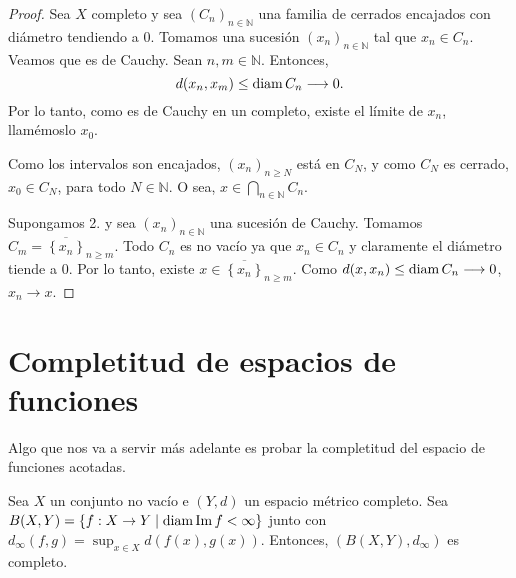 \begin{proof}
	 Sea $X$ completo y sea $(C_n)_{n \in \mathbb{N}}$ una familia de cerrados encajados con diámetro tendiendo a $0$. Tomamos una sucesión $(x_n)_{n \in \mathbb{N}}$ tal que $x_n \in C_n$. Veamos que es de Cauchy. Sean $n, m \in \mathbb{N}$. Entonces,
	\begin{equation*}
		d(x_n, x_m) \leq \operatorname{diam} C_n \longrightarrow 0.
	\end{equation*}
	Por lo tanto, como es de Cauchy en un completo, existe el límite de $x_n$, llamémoslo $x_0$.

	Como los intervalos son encajados, $(x_n)_{n \geq N}$ está en $C_N$, y como $C_N$ es cerrado, $x_0 \in C_N$, para todo $N \in \mathbb{N}$. O sea, $x \in \bigcap_{n \in \mathbb{N}} C_n$.

	 Supongamos 2. y sea $(x_n)_{n \in \mathbb{N}}$ una sucesión de Cauchy. Tomamos $C_m = \overline{\left\{ x_n \right\}}_{n \geq m}$. Todo $C_n$ es no vacío ya que $x_n \in C_n$ y claramente el diámetro tiende a $0$. Por lo tanto, existe $x \in \overline{\left\{ x_n \right\}}_{n \geq m}$. Como $d(x, x_n) \leq \operatorname{diam} C_n \longrightarrow 0$, $x_n \longrightarrow x$.
\end{proof}

\section{Completitud de espacios de funciones}

Algo que nos va a servir más adelante es probar la completitud del espacio de funciones acotadas.

\begin{theorem}
	Sea $X$ un conjunto no vacío e $(Y, d)$ un espacio métrico completo. Sea $B(X, Y) = \left\{ f : X \to Y \mid \operatorname{diam} \operatorname{Im} f < \infty \right\}$ junto con $d_{\infty} (f, g) = \sup_{x \in X} d(f(x), g(x))$. Entonces, $(B(X, Y), d_{\infty})$ es completo.
\end{theorem}

